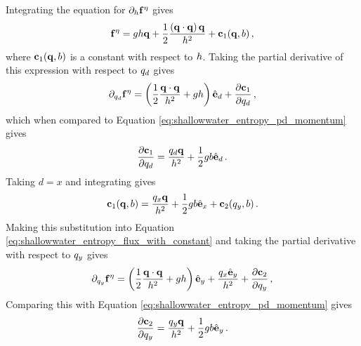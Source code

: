 Integrating the equation for $\partial_h\mathbf{f}^\eta$
gives
\begin{equation}\label{eq:shallowwater_entropy_flux_with_constant}
  \mathbf{f}^\eta
  = gh\mathbf{q}
  + \frac{1}{2}\frac{\left(\mathbf{q}\cdot\mathbf{q}\right)\mathbf{q}} 
  {h^2}
  + \mathbf{c}_1(\mathbf{q}, b) \,,
\end{equation}
where $\mathbf{c}_1(\mathbf{q}, b)$ is a constant with respect
to $h$.  Taking the partial derivative of this expression with respect to
$q_d$ gives
\begin{equation}
  \partial_{q_d}\mathbf{f}^\eta
  = \left(\frac{1}{2}\frac{\mathbf{q}\cdot\mathbf{q}}{h^2}
    + gh\right)\hat{\mathbf{e}}_d + \frac{\partial \mathbf{c}_1}{\partial q_d}
  \,,
\end{equation}
which when compared to Equation \eqref{eq:shallowwater_entropy_pd_momentum}
gives
\begin{equation}
  \frac{\partial \mathbf{c}_1}{\partial q_d}
  = \frac{q_d\mathbf{q}}{h^2}
  + \frac{1}{2}gb\hat{\mathbf{e}}_d
  \,.
\end{equation}
Taking $d=x$ and integrating gives
\begin{equation}
  \mathbf{c}_1(\mathbf{q},b)
  = \frac{q_x\mathbf{q}}{h^2}
  + \frac{1}{2}gb\hat{\mathbf{e}}_x
  + \mathbf{c}_2(q_y,b)
  \,.
\end{equation}
Making this substitution into Equation
\eqref{eq:shallowwater_entropy_flux_with_constant}
and taking the partial derivative with respect to $q_y$
gives
\begin{equation}
  \partial_{q_y}\mathbf{f}^\eta
  = \left(\frac{1}{2}\frac{\mathbf{q}\cdot\mathbf{q}}{h^2}
    + gh\right)\hat{\mathbf{e}}_y
  + \frac{q_x\hat{\mathbf{e}}_y}{h^2}
  + \frac{\partial \mathbf{c}_2}{\partial q_y}
  \,,
\end{equation}
Comparing this with Equation \eqref{eq:shallowwater_entropy_pd_momentum}
gives
\begin{equation}
  \frac{\partial \mathbf{c}_2}{\partial q_y}
  = \frac{q_y\mathbf{q}}{h^2}
  + \frac{1}{2}gb\hat{\mathbf{e}}_y
  \,.
\end{equation}
